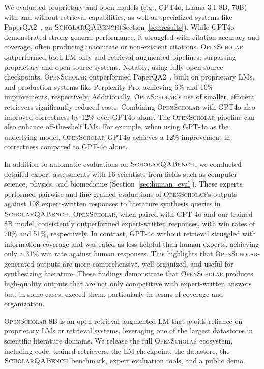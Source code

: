 \documentclass{article} %
\newcommand{\data}{$\textsc{ScholarQABench}$\xspace}
\newcommand{\model}{\textsc{OpenScholar}\xspace}
\begin{document}
We evaluated proprietary and open models (e.g., GPT4o, Llama 3.1 8B, 70B) with and without retrieval capabilities, as well as specialized systems like PaperQA2~\citep{skarlinski2024language}, on \data (Section~\ref{sec:results}). While GPT4o demonstrated strong general performance, it struggled with citation accuracy and coverage, often producing inaccurate or non-existent citations.
\model outperformed both LM-only and retrieval-augmented pipelines, surpassing proprietary and open-source systems. Notably, using fully open-source checkpoints, \model outperformed PaperQA2~\citep{skarlinski2024language}, built on proprietary LMs, and production systems like Perplexity Pro, achieving 6\% and 10\% improvements, respectively. Additionally, \model's use of smaller, efficient retrievers significantly reduced costs.
Combining \model with GPT4o also improved correctness by 12\% over GPT4o alone.
The \model pipeline can also enhance off-the-shelf LMs. For example, when using GPT-4o as the underlying model, \model-GPT4o achieves a 12\% improvement in correctness compared to GPT-4o alone. 
 
In addition to automatic evaluations on \data, we conducted detailed expert assessments with 16 scientists from fields such as computer science, physics, and biomedicine (Section~\ref{sec:human_eval}). These experts performed pairwise and fine-grained evaluations of \model's outputs against 108 expert-written responses to literature synthesis queries in \data. 
\model, when paired with GPT-4o and our trained 8B model, consistently outperformed expert-written responses, with win rates of 70\% and 51\%, respectively. 
In contrast, GPT-4o without retrieval struggled with information coverage and was rated as less helpful than human experts, achieving only a 31\% win rate against human responses.  
This highlights that \model-generated outputs are more comprehensive, well-organized, and useful for synthesizing literature.
These findings demonstrate that \model produces high-quality outputs that are not only competitive with expert-written answers but, in some cases, exceed them, particularly in terms of coverage and organization.

\model-8B is an open retrieval-augmented LM that avoids reliance on proprietary LMs or retrieval systems, leveraging one of the largest datastores in scientific literature domains. 
We release the full \model ecosystem, including code, trained retrievers, the LM checkpoint, the datastore, the \data benchmark, expert evaluation tools, and a public demo.
\end{document}

